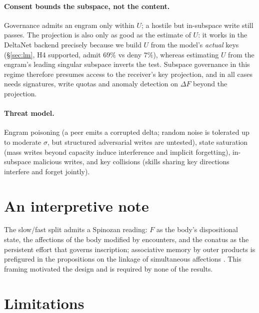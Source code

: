 \documentclass[11pt]{article}
\theoremstyle{definition}
\newcommand{\F}{F}
\begin{document}
\paragraph{Consent bounds the subspace, not the content.}
Governance admits an engram only within $U$; a hostile but in-subspace write still passes. The projection is also only as good as the estimate of $U$: it works in the DeltaNet backend precisely because we build $U$ from the model's \emph{actual} keys (\S\ref{sec:lm}, H4 supported, admit $69\%$ vs deny $7\%$), whereas estimating $U$ from the engram's leading singular subspace inverts the test. Subspace governance in this regime therefore presumes access to the receiver's key projection, and in all cases needs signatures, write quotas and anomaly detection on $\Delta\F$ beyond the projection.

\paragraph{Threat model.}
Engram poisoning (a peer emits a corrupted delta; random noise is tolerated up to moderate $\sigma$, but structured adversarial writes are untested), state saturation (mass writes beyond capacity induce interference and implicit forgetting), in-subspace malicious writes, and key collisions (skills sharing key directions interfere and forget jointly).

\section{An interpretive note}

The slow/fast split admits a Spinozan reading: $\F$ as the body's dispositional state, the affections of the body modified by encounters, and the conatus as the persistent effort that governs inscription; associative memory by outer products is prefigured in the propositions on the linkage of simultaneous affections \cite{spinoza1677}. This framing motivated the design and is required by none of the results.

\section{Limitations}
\end{document}
